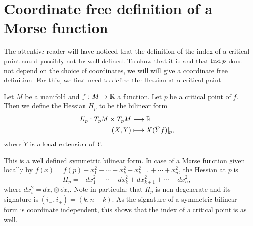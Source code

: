 

\section{Coordinate free definition of a Morse function}


The attentive reader will have noticed that the definition of the index of a critical point could possibly not be well defined.
To show that it is and that $\operatorname{Ind} p$ does not depend on the choice of coordinates, we will will give a coordinate free definition. For this, we first need to define the Hessian at a critical point.

\begin{definition}
    Let $M$ be a manifold and $f: M \to  \mathbb{R}$ a function.
    Let $p$ be a critical point of $f$.
    Then we define the Hessian $H_p$ to be the bilinear form
    \begin{align*}
        H_p: T_pM \times T_pM &\longrightarrow  \mathbb{R}\\
        (X, Y) &\longmapsto X (\tilde{Y} f)|_p
    ,\end{align*} 
    where $\tilde{Y}$ is a local extension of $Y$.
\end{definition}
This is a well defined symmetric bilinear form.
In case of a Morse function given locally by $f(x) = f(p) - x_1^2 - \cdots - x_k^2 + x_{k+1}^2 + \cdots + x_n^2$, the Hessian at $p$ is 
\[
    H_p = - dx_1^2 - \cdots - dx_k^2 + dx_{k+1}^2  + \cdots + dx_n^2
,\] 
where $dx_i^2 = dx_i \otimes dx_i$.
Note in particular that $H_p$ is non-degenerate and its signature is $(i_-, i_{+}) = (k, n-k)$.
As the signature of a symmetric bilinear form is coordinate independent, this shows that the index of a critical point is as well.


